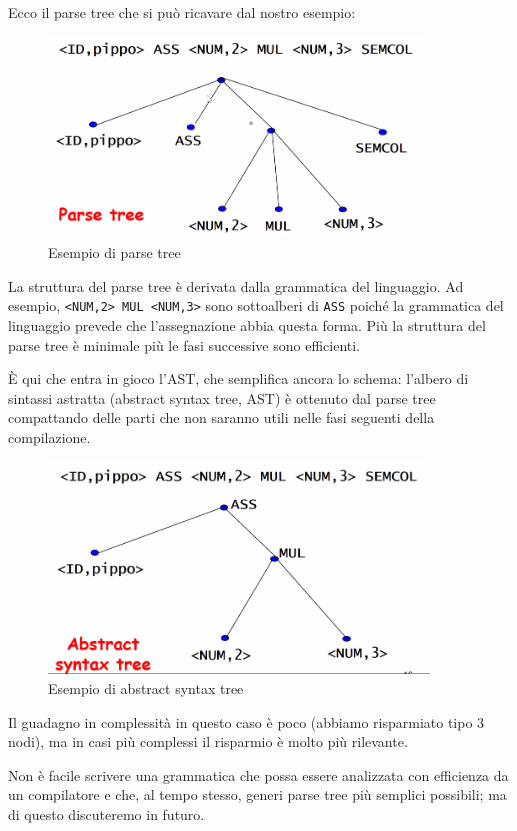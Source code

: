 \documentclass[class=book, crop=false, oneside, 12pt]{standalone}
\begin{document}
Ecco il parse tree che si può ricavare dal nostro esempio: 
\begin{figure}[H]
	\centering
	\includegraphics[width=0.9\textwidth,keepaspectratio]{parse_tree}
	\caption{Esempio di parse tree}
\end{figure}
La struttura del parse tree è derivata dalla grammatica del linguaggio. Ad esempio, \texttt{<NUM,2> MUL <NUM,3>} sono sottoalberi di \texttt{ASS} poiché la grammatica del linguaggio prevede che l’assegnazione abbia questa forma.
Più la struttura del parse tree è minimale più le fasi successive sono efficienti.

È qui che entra in gioco l’AST, che semplifica ancora lo schema: l’albero di sintassi astratta (abstract syntax tree, AST) è ottenuto dal parse tree compattando delle parti che non saranno utili nelle fasi seguenti della compilazione.
\begin{figure}[H]
	\centering
	\includegraphics[width=0.9\textwidth,keepaspectratio]{abstract_syntax_tree}
	\caption{Esempio di abstract syntax tree}
	\label{esempio_AST}
\end{figure}
Il guadagno in complessità in questo caso è poco (abbiamo risparmiato tipo 3 nodi), ma in casi più complessi il risparmio è molto più rilevante.

Non è facile scrivere una grammatica che possa essere analizzata con efficienza da un compilatore e che, al tempo stesso, generi parse tree più semplici possibili; ma di questo discuteremo in futuro.
\end{document}
